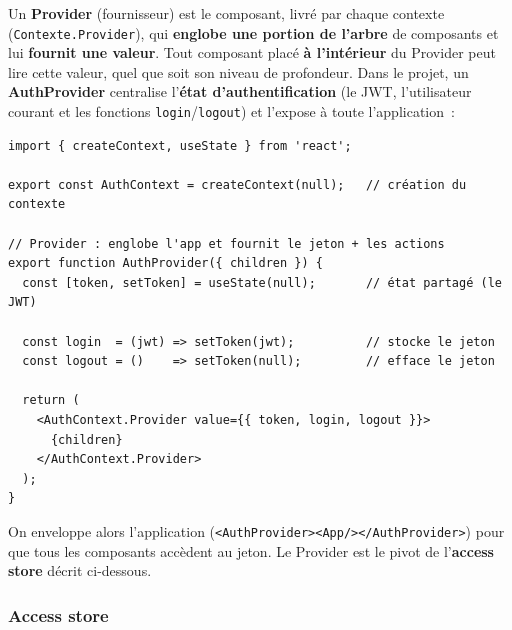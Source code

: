 \noindent Un \textbf{Provider} (\og{}fournisseur\fg{}) est le composant, livré par chaque contexte (\texttt{Contexte.Provider}), qui \textbf{englobe une portion de l'arbre} de composants et lui \textbf{fournit une valeur}. Tout composant placé \textbf{à l'intérieur} du Provider peut lire cette valeur, quel que soit son niveau de profondeur. Dans le projet, un \textbf{AuthProvider} centralise l'\textbf{état d'authentification} (le JWT, l'utilisateur courant et les fonctions \texttt{login}/\texttt{logout}) et l'expose à toute l'application~:
\begin{verbatim}
import { createContext, useState } from 'react';

export const AuthContext = createContext(null);   // création du contexte

// Provider : englobe l'app et fournit le jeton + les actions
export function AuthProvider({ children }) {
  const [token, setToken] = useState(null);       // état partagé (le JWT)

  const login  = (jwt) => setToken(jwt);          // stocke le jeton
  const logout = ()    => setToken(null);         // efface le jeton

  return (
    <AuthContext.Provider value={{ token, login, logout }}>
      {children}
    </AuthContext.Provider>
  );
}
\end{verbatim}
\noindent On enveloppe alors l'application (\texttt{<AuthProvider><App/></AuthProvider>}) pour que tous les composants accèdent au jeton. Le Provider est le pivot de l'\textbf{access store} décrit ci-dessous.

\vspace{0.4cm}

\subsubsection*{Access store}
{}

